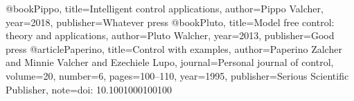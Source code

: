 @book{Pippo,
  title={Intelligent control applications},
  author={Pippo Valcher},
  year={2018},
  publisher={Whatever press}
}
@book{Pluto,
  title={Model free control: theory and applications},
  author={Pluto Walcher},
  year={2013},
  publisher={Good press}
}
@article{Paperino,
  title={Control with examples},
  author={Paperino Zalcher and Minnie Valcher and Ezechiele Lupo},
  journal={Personal journal of control},
  volume={20},
  number={6},
  pages={100--110},
  year={1995},
  publisher={Serious Scientific Publisher},
  note={doi: 10.1001000100100}
}